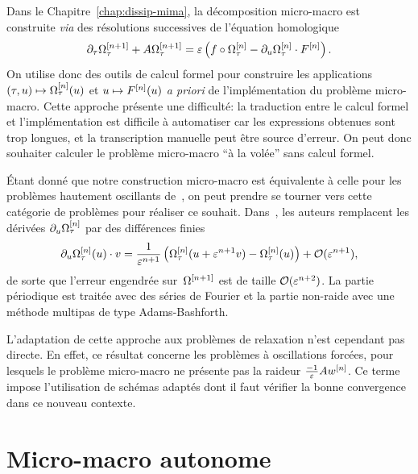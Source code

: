 Dans le Chapitre~\ref{chap:dissip-mima}, la décomposition micro-macro est construite \textit{via} des résolutions successives de l'équation homologique
\begin{equation}
    \partial_\tau \Omega^{[n+1]} _\tau + A\Omega^{[n+1]} _\tau
    = \varepsilon \left( 
        f \circ \Omega^{[n]} _\tau 
        - \partial_u \Omega^{[n]} _\tau \cdot F^{[n]} 
    \right) .
\end{equation}
On utilise donc des outils de calcul formel pour construire les applications~$(\tau, u) \mapsto \Omega^{[n]} _\tau(u)$ et $u \mapsto F^{[n]} (u)$ \textit{a priori} de l'implémentation du problème micro-macro. Cette approche présente une difficulté: la traduction entre le calcul formel et l'implémentation est difficile à automatiser car les expressions obtenues sont trop longues, et la transcription manuelle peut être source d'erreur. On peut donc souhaiter calculer le problème micro-macro \enquote{à la volée} sans calcul formel. 

Étant donné que notre construction micro-macro est équivalente à celle pour les problèmes hautement oscillants de~\cite{chartier.2020.new}, on peut prendre se tourner vers cette catégorie de problèmes pour réaliser ce souhait. Dans~\cite{chartier.2020.derivative}, les auteurs remplacent les dérivées $\partial_u \Omega^{[n]} _\tau$ par des différences finies 
\begin{equation*}
    \partial_u \Omega^{[n]} _\tau (u) \cdot v
    = \frac{1}{\varepsilon^{n+1}} \left( 
        \Omega^{[n]} _\tau (u + \varepsilon^{n+1} v ) - \Omega^{[n]} _\tau (u)
    \right) + \mathcal{O}( \varepsilon^{n+1} ) ,
\end{equation*}
de sorte que l'erreur engendrée sur~$\Omega^{[n+1]}$ est de taille $\mathcal{O}(\varepsilon^{n+2})$. La partie périodique est traitée avec des séries de Fourier et la partie non-raide avec une méthode multipas de type Adams-Bashforth.

L'adaptation de cette approche aux problèmes de relaxation n'est cependant pas directe. En effet, ce résultat concerne les problèmes à oscillations forcées, pour lesquels le problème micro-macro ne présente pas la raideur $\frac{-1}{\varepsilon}A w^{[n]}$. Ce terme impose l'utilisation de schémas adaptés dont il faut vérifier la bonne convergence dans ce nouveau contexte.



\section{Micro-macro autonome}
\label{ext:sec:auto}

